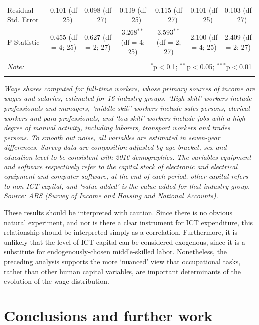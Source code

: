 \documentclass[a4paper,11pt,notitlepage]{article}
\begin{document}
\begin{table}
\begin{center}
\begin{tabular}{@{\extracolsep{5pt}}lcccccc}
Residual Std. Error & 0.101 (df = 25) & 0.098 (df = 27) & 0.109 (df = 25) & 0.115 (df = 27) & 0.101 (df = 25) & 0.103 (df = 27) \\ 
F Statistic & 0.455 (df = 4; 25) & 0.627 (df = 2; 27) & 3.268$^{**}$ (df = 4; 25) & 3.593$^{**}$ (df = 2; 27) & 2.100 (df = 4; 25) & 2.409 (df = 2; 27) \\ 
\hline 
\hline \\[-1.8ex] 
\textit{Note:}  & \multicolumn{6}{r}{$^{*}$p$<$0.1; $^{**}$p$<$0.05; $^{***}$p$<$0.01} \\ 
\normalsize 
\end{tabular} 
\end{center}
{\em Wage shares computed for full-time workers, whose primary sources of income are wages and salaries, estimated for 16 industry groups. `High skill' workers include professionals and managers, `middle skill' workers include sales persons, clerical workers and para-professionals, and `low skill' workers include jobs with a high degree of manual activity, including laborers, transport workers and trades persons. To smooth out noise, all variables are estimated in seven-year differences. Survey data are composition adjusted by age bracket, sex and education level to be consistent with 2010 demographics. The variables {\em equipment} and {\em software} respectively refer to the capital stock of electronic and electrical equipment and computer software, at the end of each period. {\em other capital} refers to non-ICT capital, and {\em `value added'} is the value added for that industry group. Source: ABS (Survey of Income and Housing and National Accounts).}
\end{table} 

These results should be interpreted with caution. Since there is no obvious natural experiment, and nor is there a clear instrument for ICT expenditure, this relationship should be interpreted simply as a correlation. Furthermore, it is unlikely that the level of ICT capital can be considered exogenous, since it is a substitute for endogenously-chosen middle-skilled labor. Nonetheless, the preceding analysis supports the more `nuanced' view that occupational tasks, rather than other human capital variables, are important determinants of the evolution of the wage distribution.

\section{Conclusions and further work}
\end{document}
